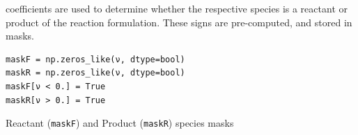 \documentclass[a4paper]{article}
\begin{document}
coefficients are used to determine whether the respective species is a reactant
or product of the reaction formulation. These signs are pre-computed, and stored
in masks.
\begin{listing}[H]
	\centering
	\begin{minipage}{0.5\linewidth}
		\begin{verbatim}
maskF = np.zeros_like(ν, dtype=bool)
maskR = np.zeros_like(ν, dtype=bool)
maskF[ν < 0.] = True
maskR[ν > 0.] = True
		\end{verbatim}
	\end{minipage}
	\caption[Reactant and Product species masks]{Reactant (\texttt{maskF}) and Product (\texttt{maskR}) species masks}
	\label{lst:directionMasks}
\end{listing}
\end{document}
